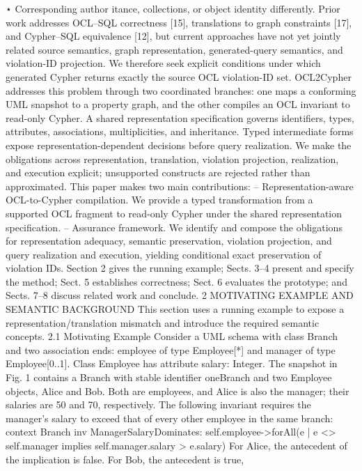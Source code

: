 ⋆ Corresponding author
itance, collections, or object identity differently. Prior work addresses OCL–SQL correctness [15], translations to graph constraints [17], and Cypher–SQL equivalence [12],
but current approaches have not yet jointly related source semantics, graph representation, generated-query semantics, and violation-ID projection. We therefore seek explicit
conditions under which generated Cypher returns exactly the source OCL violation-ID
set.
OCL2Cypher addresses this problem through two coordinated branches: one maps
a conforming UML snapshot to a property graph, and the other compiles an OCL invariant to read-only Cypher. A shared representation specification governs identifiers,
types, attributes, associations, multiplicities, and inheritance. Typed intermediate forms
expose representation-dependent decisions before query realization. We make the obligations across representation, translation, violation projection, realization, and execution explicit; unsupported constructs are rejected rather than approximated.
This paper makes two main contributions:
– Representation-aware OCL-to-Cypher compilation. We provide a typed transformation from a supported OCL fragment to read-only Cypher under the shared representation specification.
– Assurance framework. We identify and compose the obligations for representation
adequacy, semantic preservation, violation projection, and query realization and execution, yielding conditional exact preservation of violation IDs.
Section 2 gives the running example; Sects. 3–4 present and specify the method;
Sect. 5 establishes correctness; Sect. 6 evaluates the prototype; and Sects. 7–8 discuss
related work and conclude.
2 MOTIVATING EXAMPLE AND SEMANTIC BACKGROUND
This section uses a running example to expose a representation/translation mismatch
and introduce the required semantic concepts.
2.1 Motivating Example
Consider a UML schema with class Branch and two association ends: employee of type
Employee[*] and manager of type Employee[0..1]. Class Employee has attribute
salary: Integer. The snapshot in Fig. 1 contains a Branch with stable identifier
oneBranch and two Employee objects, Alice and Bob. Both are employees, and Alice
is also the manager; their salaries are 50 and 70, respectively.
The following invariant requires the manager’s salary to exceed that of every other
employee in the same branch:
context Branch inv ManagerSalaryDominates:
self.employee->forAll(e |
e <> self.manager implies
self.manager.salary > e.salary)
For Alice, the antecedent of the implication is false. For Bob, the antecedent is true,
